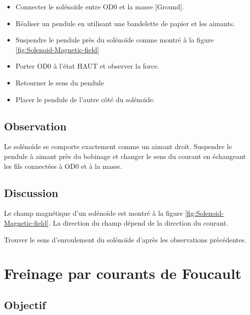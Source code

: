 \documentclass{book}
\begin{document}
\begin{itemize}
  \item Connecter le solénoïde entre OD0 et la masse [Ground].
  \item Réaliser un pendule en utilisant une bandelette de papier et les aimants.
  \item Suspendre le pendule près du solénoïde comme montré à la figure  \ref{fig:Solenoid-Magnetic-field}
  \item Porter OD0 à l'état HAUT et observer la force.
  \item Retourner le sens du pendule
  \item Placer le pendule de l'autre côté du solénoïde.
\end{itemize}

\subsection{Observation}


Le solénoïde se comporte exactement comme un aimant droit. Suspendre le pendule à aimant près du bobinage et changer le sens du courant en échangeant les fils connectées à OD0 et à la masse.

\subsection{Discussion}


Le champ magnétique d'un solénoïde est montré à la figure  \ref{fig:Solenoid-Magnetic-field}. La direction du champ dépend de la direction du courant.



Trouver le sens d'enroulement du solénoïde d'après les observations précédentes.







\section{Freinage par courants de Foucault}



\subsection{Objectif}
\end{document}
